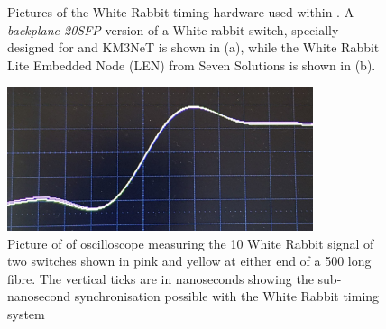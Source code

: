 \begin{figure} %
    \centering
    \quad
    \caption[Pictures of the White Rabbit timing hardware used within \chipsfive.]
    {Pictures of the White Rabbit timing hardware used within \chipsfive. A \emph{backplane-20SFP}
        version of a White rabbit switch, specially designed for \chips and KM3NeT is shown in
        (a), while the White Rabbit Lite Embedded Node (LEN) from Seven Solutions is shown in
        (b).}
\end{figure}

\begin{figure} %
    \includegraphics[width=0.8\textwidth]{diagrams/5-daq/sync.jpg}
    \caption[Picture of White Rabbit timing synchronisation seen in \chips.]
    {Picture of of oscilloscope measuring the \unit{10}{} White Rabbit signal of two
        switches shown in pink and yellow at either end of a \unit{500}{} long fibre.
        The vertical ticks are in nanoseconds showing the sub-nanosecond synchronisation possible
        with the White Rabbit timing system}
    \label{fig:sync}
\end{figure}

